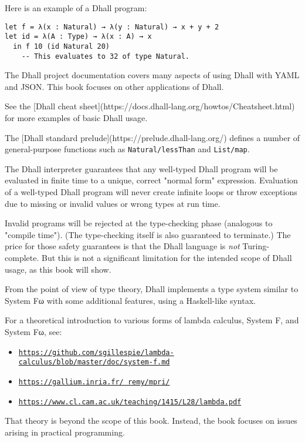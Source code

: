 Here is an example of a Dhall program:


\begin{lstlisting}[language=Dhall]
let f = λ(x : Natural) → λ(y : Natural) → x + y + 2
let id = λ(A : Type) → λ(x : A) → x
  in f 10 (id Natural 20)
    -- This evaluates to 32 of type Natural.
\end{lstlisting}


The Dhall project documentation covers many aspects of using Dhall with YAML and JSON.
This book focuses on other applications of Dhall.


See the [Dhall cheat sheet](https://docs.dhall-lang.org/howtos/Cheatsheet.html) for more examples of basic Dhall usage.


The [Dhall standard prelude](https://prelude.dhall-lang.org/) defines a number of general-purpose functions
such as \lstinline!Natural/lessThan! and \lstinline!List/map!.


The Dhall interpreter guarantees that any well-typed Dhall program will be evaluated in finite time to a unique, correct "normal form" expression.
Evaluation of a well-typed Dhall program will never create infinite loops or throw exceptions due to missing or invalid values or wrong types at run time.


Invalid programs will be rejected at the type-checking phase (analogous to "compile time").
(The type-checking itself is also guaranteed to terminate.)
The price for those safety guarantees is that the Dhall language is \emph{not} Turing-complete.
But this is not a significant limitation for the intended scope of Dhall usage, as this book will show.


From the point of view of type theory, Dhall implements a type system similar to System Fω with some additional features, using a Haskell-like syntax.


For a theoretical introduction to various forms of lambda calculus, System F, and System Fω, see:


\begin{itemize}
\item{\texttt{\href{https://github.com/sgillespie/lambda-calculus/blob/master/doc/system-f.md}{https://github.com/sgillespie/lambda-calculus/blob/master/doc/system-f.md}}}
\item{\texttt{\href{https://gallium.inria.fr/~remy/mpri/}{https://gallium.inria.fr/~remy/mpri/}}}
\item{\texttt{\href{https://www.cl.cam.ac.uk/teaching/1415/L28/lambda.pdf}{https://www.cl.cam.ac.uk/teaching/1415/L28/lambda.pdf}}}
\end{itemize}
That theory is beyond the scope of this book.
Instead, the book focuses on issues arising in practical programming.


